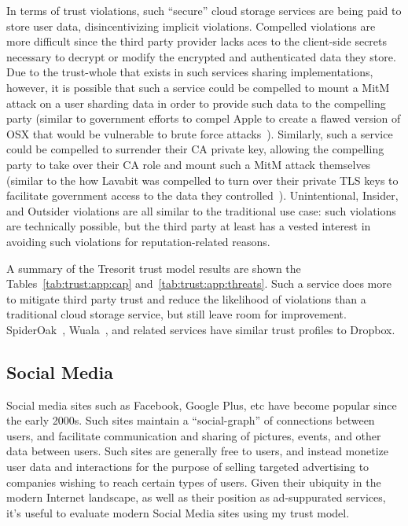 In terms of trust violations, such ``secure'' cloud storage services
are being paid to store user data, disincentivizing implicit
violations. Compelled violations are more difficult since the third
party provider lacks aces to the client-side secrets necessary to
decrypt or modify the encrypted and authenticated data they store. Due
to the trust-whole that exists in such services sharing
implementations, however, it is possible that such a service could be
compelled to mount a MitM attack on a user sharding data in order to
provide such data to the compelling party (similar to government
efforts to compel Apple to create a flawed version of OSX that would
be vulnerable to brute force attacks~\cite{ars-cookvfbi}). Similarly,
such a service could be compelled to surrender their CA private key,
allowing the compelling party to take over their CA role and mount
such a MitM attack themselves (similar to the how Lavabit was
compelled to turn over their private TLS keys to facilitate government
access to the data they
controlled~\cite{levsion-lavabit}). Unintentional, Insider, and
Outsider violations are all similar to the traditional use case: such
violations are technically possible, but the third party at least has
a vested interest in avoiding such violations for reputation-related
reasons.

A summary of the Tresorit trust model results are shown the
Tables~\ref{tab:trust:app:cap} and~\ref{tab:trust:app:threats}. Such a
service does more to mitigate third party trust and reduce the
likelihood of violations than a traditional cloud storage service, but
still leave room for improvement. SpiderOak~\cite{spideroak},
Wuala~\cite{wuala}, and related services have similar trust profiles
to Dropbox.

\subsection{Social Media}

Social media sites such as Facebook, Google Plus, etc have become
popular since the early 2000s. Such sites maintain a ``social-graph''
of connections between users, and facilitate communication and sharing
of pictures, events, and other data between users. Such sites are
generally free to users, and instead monetize user data and
interactions for the purpose of selling targeted advertising to
companies wishing to reach certain types of users. Given their
ubiquity in the modern Internet landscape, as well as their position
as ad-suppurated services, it's useful to evaluate modern Social Media
sites using my trust model.

